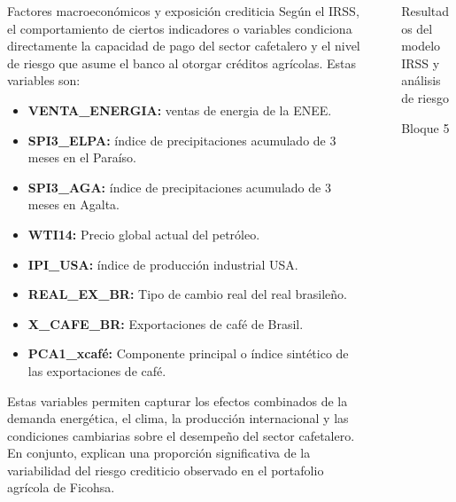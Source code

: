 \documentclass[final]{beamer}
\newlength{\sepwidth}
\newlength{\colwidth}
\newcommand{\separatorcolumn}{\begin{column}{\sepwidth}\end{column}}
\begin{document}
\begin{frame}[t]
\begin{columns}[t]
\begin{column}{\colwidth}
\begin{block}{Factores macroeconómicos y exposición crediticia}
{Según el IRSS, el comportamiento de ciertos indicadores o variables condiciona directamente la capacidad de pago del sector cafetalero y el nivel de riesgo que asume el banco al otorgar créditos agrícolas. Estas variables son: }
{\small
\begin{itemize}
\item \textbf{VENTA\_ENERGIA:} ventas de energia de la ENEE.
\item \textbf{SPI3\_ELPA:} índice de precipitaciones acumulado de 3 meses en el Paraíso.
\item \textbf{SPI3\_AGA:} índice de precipitaciones acumulado de 3 meses en Agalta.
\item \textbf{WTI14:} Precio global actual del petróleo.
\item \textbf{IPI\_USA:} índice de producción industrial USA.
\item \textbf{REAL\_EX\_BR:} Tipo de cambio real del real brasileño.
\item \textbf{X\_CAFE\_BR:} Exportaciones de café de Brasil.
\item \textbf{PCA1\_xcafé:} Componente principal o índice sintético de las exportaciones de café.
\end{itemize}
}
{ Estas variables permiten capturar los efectos combinados de la demanda energética, el clima, la producción internacional y las condiciones cambiarias sobre el desempeño del sector cafetalero. En conjunto, explican una proporción significativa de la variabilidad del riesgo crediticio observado en el portafolio agrícola de Ficohsa.}
  \end{block}

\end{column}

\separatorcolumn

\begin{column}{\colwidth}
  \begin{block}{Resultados del modelo IRSS y análisis de riesgo}



  \end{block}
  \begin{block}{Bloque 5}


\end{block}
\end{column}
\end{columns}
\end{frame}
\end{document}
